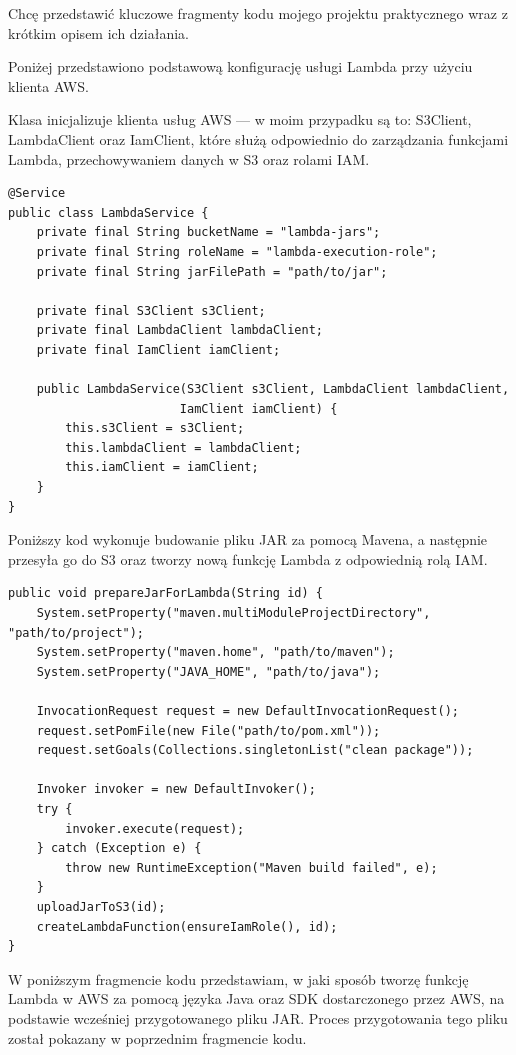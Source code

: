 \documentclass[runningheads,12pt]{llncs}
\begin{document}
Chcę przedstawić kluczowe fragmenty kodu mojego projektu praktycznego wraz z krótkim opisem ich działania.

Poniżej przedstawiono podstawową konfigurację usługi Lambda przy użyciu klienta AWS.

Klasa inicjalizuje klienta usług AWS — w moim przypadku są to: S3Client, LambdaClient oraz IamClient, które służą odpowiednio do zarządzania funkcjami Lambda, przechowywaniem danych w S3 oraz rolami IAM.

\begin{verbatim}
@Service
public class LambdaService {
    private final String bucketName = "lambda-jars";
    private final String roleName = "lambda-execution-role";
    private final String jarFilePath = "path/to/jar";

    private final S3Client s3Client;
    private final LambdaClient lambdaClient;
    private final IamClient iamClient;

    public LambdaService(S3Client s3Client, LambdaClient lambdaClient, 
                        IamClient iamClient) {
        this.s3Client = s3Client;
        this.lambdaClient = lambdaClient;
        this.iamClient = iamClient;
    }
}
\end{verbatim}

Poniższy kod wykonuje budowanie pliku JAR za pomocą Mavena, a następnie przesyła go do S3 oraz tworzy nową funkcję Lambda z odpowiednią rolą IAM.

\begin{verbatim}
public void prepareJarForLambda(String id) {
    System.setProperty("maven.multiModuleProjectDirectory", "path/to/project");
    System.setProperty("maven.home", "path/to/maven");
    System.setProperty("JAVA_HOME", "path/to/java");
    
    InvocationRequest request = new DefaultInvocationRequest();
    request.setPomFile(new File("path/to/pom.xml"));
    request.setGoals(Collections.singletonList("clean package"));

    Invoker invoker = new DefaultInvoker();
    try {
        invoker.execute(request);
    } catch (Exception e) {
        throw new RuntimeException("Maven build failed", e);
    }
    uploadJarToS3(id);
    createLambdaFunction(ensureIamRole(), id);
}
\end{verbatim}

W poniższym fragmencie kodu przedstawiam, w jaki sposób tworzę funkcję Lambda w AWS za pomocą języka Java oraz SDK dostarczonego przez AWS, na podstawie wcześniej przygotowanego pliku JAR. Proces przygotowania tego pliku został pokazany w poprzednim fragmencie kodu.
\end{document}
